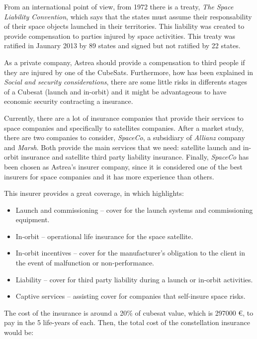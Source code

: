 From an international point of view, from 1972 there is a treaty, \textit{The Space Liability Convention}, which says that the states must assume their responsability of their space objects launched in their territories. This liability was created to provide compensation to parties injured by space activities. This treaty was ratified in Jaunary 2013 by 89 states and signed but not ratified by 22 states. \cite{UN}

As a private company, Astrea should provide a compensation to third people if they are injured by one of the CubeSats. Furthermore,  how has been explained in \textit{Social and security considerations}, there are some little risks in differents stages of a Cubesat (launch and in-orbit) and it might be advantageous to have economic security contracting a insurance. 

Currently, there are a lot of insurance companies that provide their services to space companies and specifically to  satellites companies. After a market study, there are two companies to consider, \textit{SpaceCo}, a subsidiary of \textit{Allianz} company and \textit{Marsh}. Both provide the main services that we need: satellite launch and in-orbit insurance and satellite third party liability insurance. Finally, \textit{SpaceCo} has been chosen as Astrea's insurer company, since it is considered one of the best insurers for space companies and it has more experience than others.

This insurer provides a great coverage, in which highlights:

\begin{itemize}
	\item Launch and commissioning – cover for the launch systems and commissioning equipment.
	\item In-orbit – operational life insurance for the space satellite.
	\item In-orbit incentives – cover for the manufacturer’s obligation to the client in the event of malfunction 		          or non-performance.
	\item Liability – cover for third party liability during a launch or in-orbit activities.
	\item Captive services – assisting cover for companies that self-insure space risks. \cite{allianz}
\end{itemize}

The cost of the insurance is around a 20\% of cubesat value, which is 297000 \euro, to pay in the 5 life-years of each. Then, the total cost of the constellation insurance would be:

